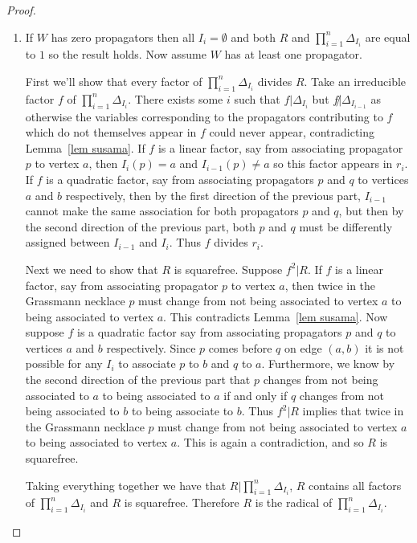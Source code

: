 \documentclass[11pt]{article}
\theoremstyle{remark}
\theoremstyle{definition}
\begin{document}
\begin{proof}
\begin{enumerate}
    \item If $W$ has zero propagators then all $I_i=\emptyset$ and both $R$ and $\prod_{i=1}^n \Delta_{I_i}$ are equal to $1$ so the result holds.  Now assume $W$ has at least one propagator.

First we'll show that every factor of $\prod_{i=1}^n \Delta_{I_i}$ divides $R$.  Take an irreducible factor $f$ of $\prod_{i=1}^n \Delta_{I_i}$. There exists some $i$ such that $f|\Delta_{I_i}$ but $f\not| \Delta_{I_{i-1}}$ as otherwise the variables corresponding to the propagators contributing to $f$ which do not themselves appear in $f$ could never appear, contradicting Lemma~\ref{lem susama}.  If $f$ is a linear factor, say from associating propagator $p$ to vertex $a$, then $I_{i}(p)=a$ and $I_{i-1}(p)\neq a$ so this factor appears in $r_i$.  If $f$ is a quadratic factor, say from associating propagators $p$ and $q$ to vertices $a$ and $b$ respectively, then by the first direction of the previous part, $I_{i-1}$ cannot make the same association for both propagators $p$ and $q$, but then by the second direction of the previous part, both $p$ and $q$ must be differently assigned between $I_{i-1}$ and $I_i$.  Thus $f$ divides $r_i$.

Next we need to show that $R$ is squarefree.  Suppose $f^2|R$.  If $f$ is a linear factor, say from associating propagator $p$ to vertex $a$, then twice in the Grassmann necklace $p$ must change from not being associated to vertex $a$ to being associated to vertex $a$.  This contradicts Lemma~\ref{lem susama}.  Now suppose $f$ is a quadratic factor say from associating propagators $p$ and $q$ to vertices $a$ and $b$ respectively.  Since $p$ comes before $q$ on edge $(a,b)$ it is not possible for any $I_i$ to associate $p$ to $b$ and $q$ to $a$.  Furthermore, we know by the second direction of the previous part that $p$ changes from not being associated to $a$ to being associated to $a$ if and only if $q$ changes from not being associated to $b$ to being associate to $b$.  Thus $f^2|R$ implies that twice in the Grassmann necklace $p$ must change from not being associated to vertex $a$ to being associated to vertex $a$. This is again a contradiction, and so $R$ is squarefree.

Taking everything together we have that $R|\prod_{i=1}^n \Delta_{I_i}$, $R$ contains all factors of $\prod_{i=1}^n \Delta_{I_i}$ and $R$ is squarefree.  Therefore $R$ is the radical of $\prod_{i=1}^n \Delta_{I_i}$.
  \end{enumerate}
\end{proof}
\end{document}

